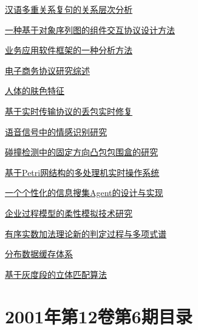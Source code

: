 \documentclass[a4paper]{article}
\begin{document}
\href{http://www.jos.org.cn/ch/reader/download_pdf.aspx?file_no=20010706&year_id=2001&quarter_id=7&falg=1}{汉语多重关系复句的关系层次分析}

\href{http://www.jos.org.cn/ch/reader/download_pdf.aspx?file_no=20010707&year_id=2001&quarter_id=7&falg=1}{一种基于对象序列图的组件交互协议设计方法}

\href{http://www.jos.org.cn/ch/reader/download_pdf.aspx?file_no=20010708&year_id=2001&quarter_id=7&falg=1}{业务应用软件框架的一种分析方法}

\href{http://www.jos.org.cn/ch/reader/download_pdf.aspx?file_no=20010709&year_id=2001&quarter_id=7&falg=1}{电子商务协议研究综述}

\href{http://www.jos.org.cn/ch/reader/download_pdf.aspx?file_no=20010710&year_id=2001&quarter_id=7&falg=1}{人体的肤色特征}

\href{http://www.jos.org.cn/ch/reader/download_pdf.aspx?file_no=20010711&year_id=2001&quarter_id=7&falg=1}{基于实时传输协议的丢包实时修复}

\href{http://www.jos.org.cn/ch/reader/download_pdf.aspx?file_no=20010712&year_id=2001&quarter_id=7&falg=1}{语音信号中的情感识别研究}

\href{http://www.jos.org.cn/ch/reader/download_pdf.aspx?file_no=20010713&year_id=2001&quarter_id=7&falg=1}{碰撞检测中的固定方向凸包包围盒的研究}

\href{http://www.jos.org.cn/ch/reader/download_pdf.aspx?file_no=20010714&year_id=2001&quarter_id=7&falg=1}{基于Petri网结构的多处理机实时操作系统}

\href{http://www.jos.org.cn/ch/reader/download_pdf.aspx?file_no=20010715&year_id=2001&quarter_id=7&falg=1}{一个个性化的信息搜集Agent的设计与实现}

\href{http://www.jos.org.cn/ch/reader/download_pdf.aspx?file_no=20010716&year_id=2001&quarter_id=7&falg=1}{企业过程模型的柔性模拟技术研究}

\href{http://www.jos.org.cn/ch/reader/download_pdf.aspx?file_no=20010717&year_id=2001&quarter_id=7&falg=1}{有序实数加法理论新的判定过程与多项式谱}

\href{http://www.jos.org.cn/ch/reader/download_pdf.aspx?file_no=20010718&year_id=2001&quarter_id=7&falg=1}{分布数据缓存体系}

\href{http://www.jos.org.cn/ch/reader/download_pdf.aspx?file_no=20010719&year_id=2001&quarter_id=7&falg=1}{基于灰度段的立体匹配算法}


\section{\textbf{2001年第12卷第6期目录}}
\end{document}
